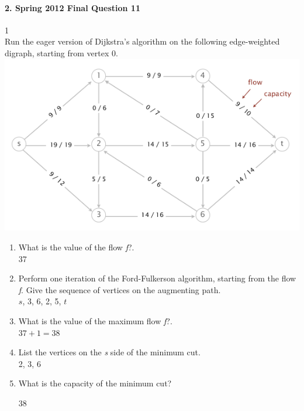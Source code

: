 \documentclass{article}
\begin{document}
\paragraph{\Large 2. Spring 2012 Final Question 11}1\mbox{}\\
Run the eager version of Dijkstra’s algorithm on the following edge-weighted digraph, starting from vertex 0.\\
\includegraphics[]{fin-s12-11.png}
\begin{enumerate}
\renewcommand{\theenumi}{\Alph{enumi}}
	\item What is the value of the flow \textit{f}?.\\
	
	37

	\item Perform one iteration of the Ford-Fulkerson algorithm, starting from the flow \textit{f}. Give the sequence of vertices on the augmenting path.\\

	$s$, 3, 6, 2, 5, $t$  

	\item What is the value of the maximum flow \textit{f}?.\\
	
	$37+1=38$

	\item List the vertices on the \textit{s} side of the minimum cut.\\

	2, 3, 6

	\item What is the capacity of the minimum cut?

	38

\end{enumerate}
\end{document}
